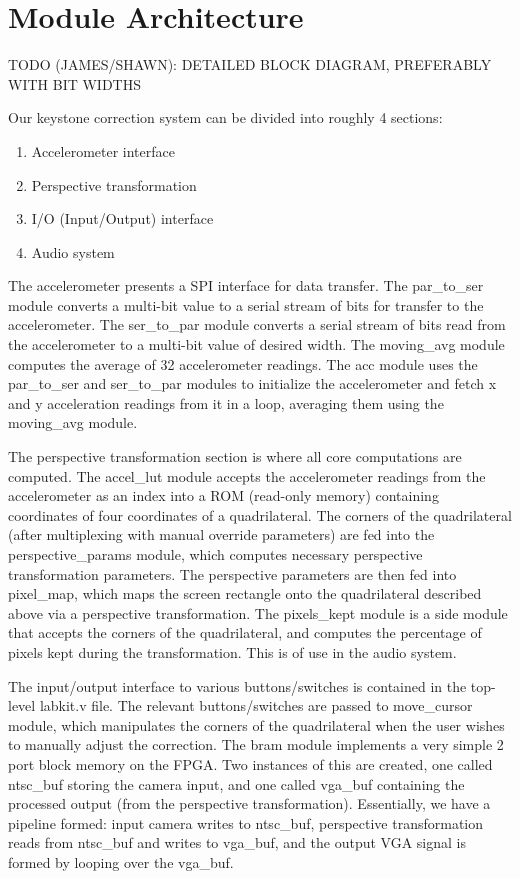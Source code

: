 \documentclass{article}
\begin{document}
\section{Module Architecture}
TODO (JAMES/SHAWN): DETAILED BLOCK DIAGRAM, PREFERABLY WITH BIT WIDTHS

Our keystone correction system can be divided into roughly 4 sections:
\begin{enumerate}
\item Accelerometer interface
\item Perspective transformation
\item  I/O (Input/Output) interface
\item Audio system
\end{enumerate}

The accelerometer presents a SPI interface for data transfer. The par\_to\_ser module converts a multi-bit value to a serial stream of bits for transfer to the accelerometer. The ser\_to\_par module converts a serial stream of bits read from the accelerometer to a multi-bit value of desired width. The moving\_avg module computes the average of 32 accelerometer readings. The acc module uses the par\_to\_ser and ser\_to\_par modules to initialize the accelerometer and fetch x and y acceleration readings from it in a loop, averaging them using the moving\_avg module.

The perspective transformation section is where all core computations are computed.
The accel\_lut module accepts the accelerometer readings from the accelerometer as an index into a ROM (read-only memory) containing coordinates of four coordinates of a quadrilateral.
The corners of the quadrilateral (after multiplexing with manual override parameters) are fed into the perspective\_params module, which computes necessary perspective transformation parameters.
The perspective parameters are then fed into pixel\_map, which maps the screen rectangle onto the quadrilateral described above via a perspective transformation.
The pixels\_kept module is a side module that accepts the corners of the quadrilateral, and computes the percentage of pixels kept during the transformation.
This is of use in the audio system.

The input/output interface to various buttons/switches is contained in the top-level labkit.v file.
The relevant buttons/switches are passed to move\_cursor module, which manipulates the corners of the quadrilateral when the user wishes to manually adjust the correction.
The bram module implements a very simple 2 port block memory on the FPGA.
Two instances of this are created, one called ntsc\_buf storing the camera input, and one called vga\_buf containing the processed output (from the perspective transformation).
Essentially, we have a pipeline formed:
input camera writes to ntsc\_buf, perspective transformation reads from ntsc\_buf and writes to vga\_buf, and the output VGA signal is formed by looping over the vga\_buf.
\end{document}
